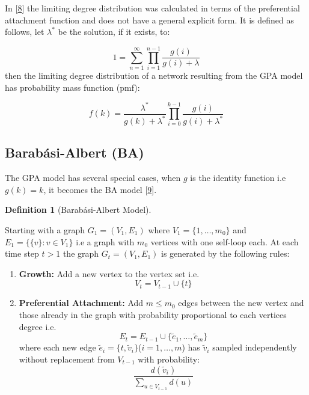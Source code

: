 \documentclass[
  10pt,
  a4paper,
]{scrreprt}
\providecommand{\tightlist}{%
  \setlength{\itemsep}{0pt}\setlength{\parskip}{0pt}}\usepackage{longtable,booktabs,array}
\theoremstyle{plain}
\theoremstyle{plain}
\theoremstyle{definition}
\newtheorem{definition}{Definition}[section]
\theoremstyle{plain}
\theoremstyle{remark}
\begin{document}
{In {[}\protect\hyperlink{ref-rudas07}{8}{]} the limiting degree
distribution was calculated in terms of the preferential attachment
function and does not have a general explicit form. It is defined as
follows, let \(\lambda^*\) be the solution, if it exists, to:

\[
1=\sum_{n=1}^\infty \prod_{i=1}^{n-1}\displaystyle\frac{g(i)}{g(i)+\lambda}
\] then the limiting degree distribution of a network resulting from the
GPA model has probability mass function (pmf):

\[
f(k) = \displaystyle\frac{\lambda^*}{g(k) + \lambda^*}\prod_{i=0}^{k-1}\displaystyle\frac{g(i)}{g(i)+\lambda^*}
\]

\hypertarget{barabuxe1si-albert-ba}{%
\subsection{Barabási-Albert (BA)}\label{barabuxe1si-albert-ba}}

The GPA model has several special cases, when \(g\) is the identity
function i.e \(g(k)=k\), it becomes the BA model
{[}\protect\hyperlink{ref-Barabasi99}{9}{]}.

\begin{definition}[Barabási-Albert
Model]\protect\hypertarget{def-ba}{}\label{def-ba}

Starting with a graph \(G_1 = (V_1, E_1)\) where
\(V_1 = \{1,\ldots,m_0\}\) and \(E_1 = \{\{v\}:v\in V_1\}\) i.e a graph
with \(m_0\) vertices with one self-loop each. At each time step \(t>1\)
the graph \(G_t = (V_1, E_1)\) is generated by the following rules:

\begin{enumerate}
\def\labelenumi{\arabic{enumi}.}
\tightlist
\item
  \textbf{Growth:} Add a new vertex to the vertex set i.e.~\[
  V_t = V_{t-1} \cup \{t\}
  \]
\item
  \textbf{Preferential Attachment:} Add \(m\le m_0\) edges between the
  new vertex and those already in the graph with probability
  proportional to each vertices degree i.e.~\[
  E_t  = E_{t-1} \cup \{\tilde e_1, \ldots, \tilde e_m\}
  \] where each new edge
  \(\tilde e_i = \{t, \tilde v_i\}\)(\(i=1,\ldots, m\)) has
  \(\tilde v_i\) sampled independently without replacement from
  \(V_{t-1}\) with probability: \[
  \frac{d(\tilde v_i)}{\sum_{u\in V_{t-1}}d(u)}
  \]
\end{enumerate}

\end{definition}

}
\end{document}
